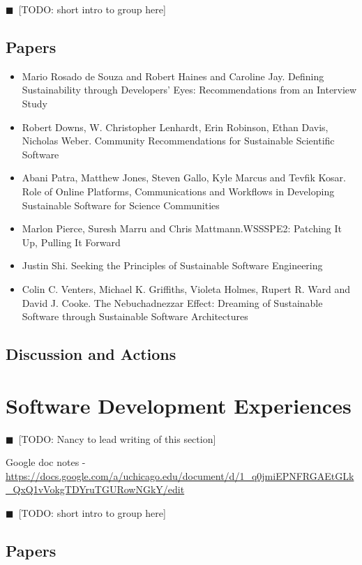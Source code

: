 \documentclass[11pt, oneside]{amsart}
\newcommand{\todo}[1]{{\color{blue}$\blacksquare$~\textsf{[TODO: #1]}}}
\begin{document}
\todo{short intro to group here}

\subsection{Papers}

\begin{itemize}
\item Mario {Rosado de Souza} and Robert Haines and Caroline Jay. Defining Sustainability through Developers' Eyes: Recommendations from an Interview Study~\cite{wssspe2_rosada_de_souza}
\item Robert Downs, W. Christopher Lenhardt, Erin Robinson, Ethan Davis, Nicholas Weber. Community Recommendations for Sustainable Scientific Software~\cite{wssspe2_downs}
\item Abani Patra, Matthew Jones, Steven Gallo, Kyle Marcus and Tevfik Kosar. Role of Online Platforms, Communications and Workflows in Developing Sustainable Software for Science Communities~\cite{wssspe2_patra}
\item Marlon Pierce, Suresh Marru and Chris Mattmann.{WSSSPE2}: Patching It Up, Pulling It Forward~\cite{wssspe2_pierce}
\item Justin Shi. Seeking the Principles of Sustainable Software Engineering~\cite{wssspe2_shi}
\item Colin C. Venters, Michael K. Griffiths, Violeta Holmes, Rupert R. Ward and David J. Cooke. The Nebuchadnezzar Effect: Dreaming of Sustainable Software through Sustainable Software Architectures~\cite{wssspe2_venters}
\end{itemize}

\subsection{Discussion and Actions}

\section{Software Development Experiences}

\todo{Nancy to lead writing of this section}

Google doc notes - \url{https://docs.google.com/a/uchicago.edu/document/d/1_q0jmiEPNFRGAEtGLk_QxQ1vVokgTDYruTGURowNGkY/edit}

\todo{short intro to group here}

\subsection{Papers}
\end{document}
